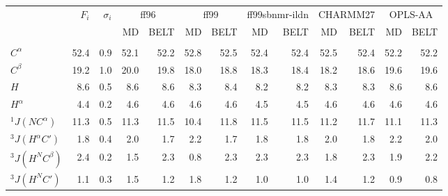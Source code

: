 \documentclass[12pt]{article}
\begin{document}
\begin{table}
\begin{tabular}{lrrrrrrrrrrrr}
\toprule
   &  $F_i$ &  $\sigma_i$ &  \multicolumn{2}{c}{ff96}             &  \multicolumn{2}{c}{ff99}    &  \multicolumn{2}{c}{ff99sbnmr-ildn}   &  \multicolumn{2}{c}{CHARMM27}       &  \multicolumn{2}{c}{OPLS-AA}               \\
   &        &             &  MD   & BELT & MD   & BELT & MD   & BELT & MD   & BELT & MD   & BELT  \\
         &      &              &          &                 &          &                 &                    &                           &           &                  &         &                \\
$C^\alpha$           & 52.4 &          0.9 &     52.1 &            52.2 &     52.8 &            52.5 &               52.4 &                      52.4 &      52.5 &             52.4 &    52.2 &           52.2 \\
$C^\beta$           & 19.2 &          1.0 &     20.0 &            19.8 &     18.0 &            18.8 &               18.3 &                      18.4 &      18.2 &             18.6 &    19.6 &           19.6 \\
$H$            &  8.6 &          0.5 &      8.6 &             8.6 &      8.3 &             8.4 &                8.2 &                       8.2 &       8.3 &              8.3 &     8.6 &            8.6 \\
$H^\alpha$           &  4.4 &          0.2 &      4.6 &             4.6 &      4.6 &             4.6 &                4.5 &                       4.5 &       4.6 &              4.6 &     4.6 &            4.6 \\
$^1J(NC^\alpha)$      & 11.3 &          0.5 &     11.3 &            11.5 &     10.4 &            11.8 &               11.5 &                      11.5 &      11.2 &             11.7 &    11.1 &           11.3 \\
$^3J(H^\alpha C\prime)$ &  1.8 &          0.4 &      2.0 &             1.7 &      2.2 &             1.7 &                1.8 &                       1.8 &       2.0 &              1.8 &     2.2 &            2.0 \\
$^3J(H^NC^\beta)$     &  2.4 &          0.2 &      1.5 &             2.3 &      0.8 &             2.3 &                2.3 &                       2.3 &       1.8 &              2.3 &     1.9 &            2.2 \\
$^3J(H^NC\prime)$ &  1.1 &          0.3 &      1.5 &             1.2 &      1.8 &             1.2 &                1.0 &                       1.0 &       1.4 &              1.2 &     0.9 &            0.8 \\

\end{tabular}
\end{table}
\end{document}
